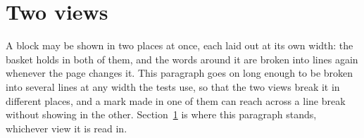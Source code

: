 \section{Two views}\label{sec:views}
A block may be shown in two places at once, each laid out at its own
width: the basket holds  in both of them,
and the words around it are broken into lines again whenever the page
changes it. This paragraph goes on long enough to be broken into several
lines at any width the tests use, so that the two views break it in
different places, and a mark made in one of them can reach across a line
break without showing in the other. Section~\ref{sec:views} is where this
paragraph stands, whichever view it is read in.

